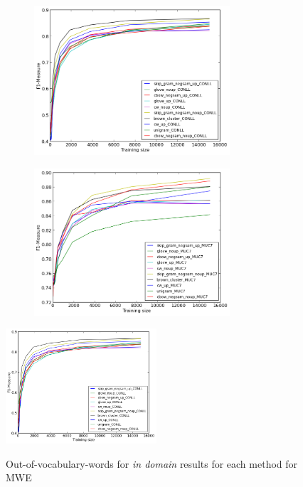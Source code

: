 \documentclass[11pt]{article}
\begin{document}
\begin{figure}
\caption{Out-of-vocabulary-words for \textit{in domain} results for each method for NER}
\centering
\begin{subfigure}{.5\textwidth}
	\centering
    	\includegraphics[width=0.8\textwidth]{plots/NERoutOfVocIN.png}
	\label{fig:inner}
\end{subfigure}
\begin{subfigure}{.5\textwidth}
	\centering
    	\includegraphics[width=0.8\textwidth]{plots/NERoutOfVocOUT.png}
	\label{fig:outner}
\end{subfigure}  	
\end{figure}


\begin{figure}
\caption{Out-of-vocabulary-words for \textit{in domain} results for each method for MWE}
\centering
    	\includegraphics[width=0.5\textwidth]{plots/NERoutOfVocIN.png}    
\label{fig:outmwe}
\end{figure}
\end{document}
